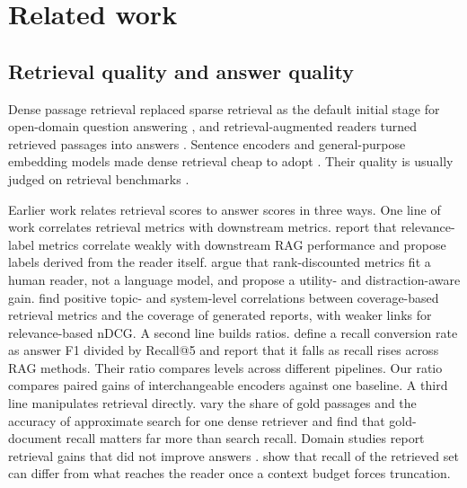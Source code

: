 \section{Related work}\label{sec:related}

\subsection{Retrieval quality and answer quality}
Dense passage retrieval replaced sparse retrieval as the default initial stage for open-domain question answering \citep{karpukhin2020dpr,lee2019orqa}, and retrieval-augmented readers turned retrieved passages into answers \citep{lewis2020rag,izacard2021fid}. Sentence encoders and general-purpose embedding models made dense retrieval cheap to adopt \citep{reimers2019sbert,wang2022e5,xiao2024cpack,zhang2025qwen3emb}. Their quality is usually judged on retrieval benchmarks \citep{thakur2021beir,muennighoff2023mteb}.

Earlier work relates retrieval scores to answer scores in three ways. One line of work correlates retrieval metrics with downstream metrics. \citet{salemi2024erag} report that relevance-label metrics correlate weakly with downstream RAG performance and propose labels derived from the reader itself. \citet{trappolini2025udcg} argue that rank-discounted metrics fit a human reader, not a language model, and propose a utility- and distraction-aware gain. \citet{samuel2026beyond} find positive topic- and system-level correlations between coverage-based retrieval metrics and the coverage of generated reports, with weaker links for relevance-based nDCG. A second line builds ratios. \citet{peng2026neocorrag} define a recall conversion rate as answer F1 divided by Recall@5 and report that it falls as recall rises across RAG methods. Their ratio compares levels across different pipelines. Our ratio compares paired gains of interchangeable encoders against one baseline. A third line manipulates retrieval directly. \citet{leto2024toward} vary the share of gold passages and the accuracy of approximate search for one dense retriever and find that gold-document recall matters far more than search recall. Domain studies report retrieval gains that did not improve answers \citep{mathur2026policy,medrano2026fusion,muthyam2026systems,ghosh2026evidence}. \citet{bala2026recall} show that recall of the retrieved set can differ from what reaches the reader once a context budget forces truncation.

